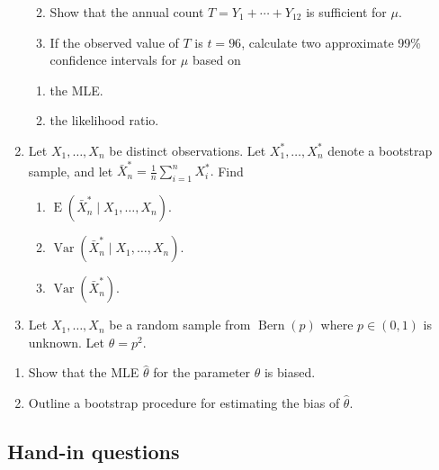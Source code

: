 \documentclass[
]{book}
\providecommand{\tightlist}{%
  \setlength{\itemsep}{0pt}\setlength{\parskip}{0pt}}
\DeclareMathOperator{\E}{E}
\DeclareMathOperator{\Var}{Var}
\DeclareMathOperator{\Bern}{Bern}
\theoremstyle{definition}
\theoremstyle{definition}
\theoremstyle{definition}
\theoremstyle{definition}
\theoremstyle{remark}
\begin{document}
\begin{enumerate}
  \begin{enumerate}
  \def\labelenumii{(\alph{enumii})}
  \item
    Show that the annual count \(T=Y_1+\cdots + Y_{12}\) is sufficient for \(\mu\).
  \item
    If the observed value of \(T\) is \(t=96\), calculate two approximate 99\% confidence intervals for \(\mu\) based on
  \end{enumerate}

  \begin{enumerate}
  \def\labelenumii{\roman{enumii}.}
  \tightlist
  \item
    the MLE.
  \item
    the likelihood ratio.
  \end{enumerate}
\item
  Let \(X_1,\dots,X_n\) be distinct observations. Let \(X_1^*,\dots,X_n^*\) denote a bootstrap sample, and let \(\bar X_n^*=\frac{1}{n}\sum_{i=1}^n X_i^*.\) Find

  \begin{enumerate}
  \def\labelenumii{(\alph{enumii})}
  \tightlist
  \item
    \(\E(\bar X_n^* \mid X_1,\dots,X_n)\).
  \item
    \(\Var(\bar X_n^* \mid X_1,\dots,X_n)\).
  \item
    \(\Var(\bar X_n^* )\).
  \end{enumerate}
\item
  Let \(X_1,\dots,X_n\) be a random sample from \(\Bern(p)\) where \(p\in(0,1)\) is unknown. Let \(\theta=p^2\).
\end{enumerate}

\begin{enumerate}
\def\labelenumi{(\alph{enumi})}
\item
  Show that the MLE \(\hat\theta\) for the parameter \(\theta\) is biased.
\item
  Outline a bootstrap procedure for estimating the bias of \(\hat\theta\).
\end{enumerate}

\hypertarget{hand-in-questions-5}{%
\subsection*{Hand-in questions}\label{hand-in-questions-5}}
\end{document}
